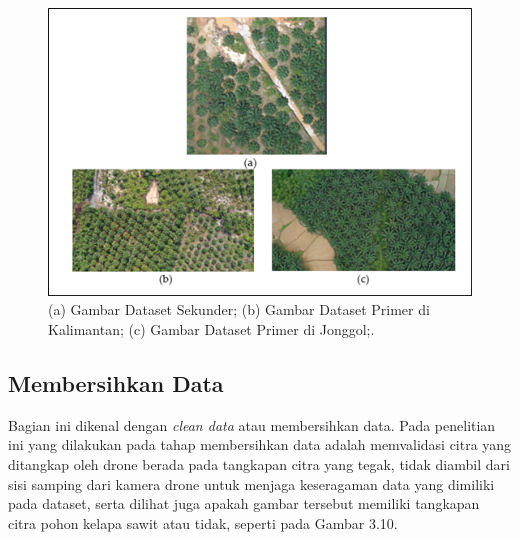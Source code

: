 \begin{enumerate}
	\begin{figure}[H]
		\vspace{-0.1cm}
		\begin{center}
			\includegraphics[width=1\columnwidth]{bab3/Gambar/Picture9.png}
		\end{center}
		\vspace{-0.2cm}
		\captionsetup{justification=centering}
		\caption{(a) Gambar Dataset Sekunder; (b) Gambar Dataset Primer di Kalimantan; (c) Gambar Dataset Primer di Jonggol;.}\label{img:Gambar-Dataset-Sekunder}
	\end{figure}
\end{enumerate}

\subsection{Membersihkan Data}
Bagian ini dikenal dengan \textit{clean data} atau membersihkan data. Pada penelitian ini yang dilakukan pada tahap membersihkan data adalah memvalidasi citra yang ditangkap oleh drone berada pada tangkapan citra yang tegak, tidak diambil dari sisi samping dari kamera drone untuk menjaga keseragaman data yang dimiliki pada dataset, serta dilihat juga apakah gambar tersebut memiliki tangkapan citra pohon kelapa sawit atau tidak, seperti pada Gambar 3.10.


